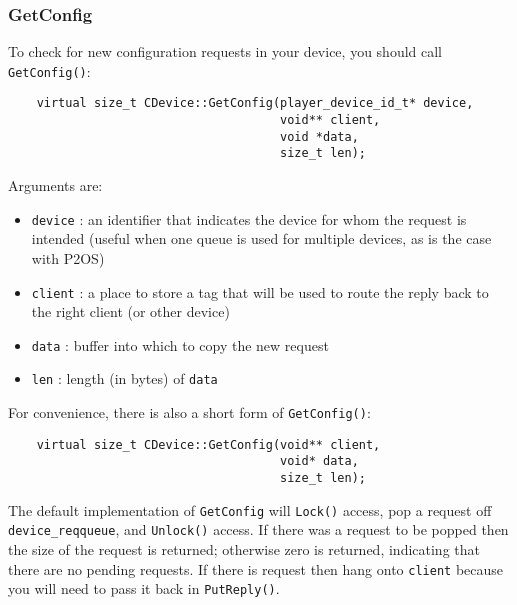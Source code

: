 \documentclass[11pt]{report}
\begin{document}
\subsubsection{GetConfig}
To check for new configuration requests in your device, you should call
{\tt GetConfig()}:
\begin{verbatim}
    virtual size_t CDevice::GetConfig(player_device_id_t* device, 
                                      void** client, 
                                      void *data, 
                                      size_t len);
\end{verbatim}
Arguments are:
\begin{itemize}
\item {\tt device} : an identifier that indicates the device for whom the
request is intended (useful when one queue is used for multiple devices,
as is the case with P2OS)
\item {\tt client} : a place to store a tag that will be used to route the 
reply back to the right client (or other device)
\item {\tt data} : buffer into which to copy the new request
\item {\tt len} : length (in bytes) of {\tt data}
\end{itemize}
For convenience, there is also a short form of {\tt GetConfig()}:
\begin{verbatim}
    virtual size_t CDevice::GetConfig(void** client,
                                      void* data,
                                      size_t len);
\end{verbatim}
The default implementation of {\tt GetConfig} will {\tt Lock()} access, 
pop a request off {\tt device\_reqqueue}, and {\tt Unlock()} access.  If
there was a request to be popped then the size of the request is returned;
otherwise zero is returned, indicating that there are no pending requests.
If there is request then hang onto {\tt client} because you will need to pass 
it back in {\tt PutReply()}.
\end{document}
